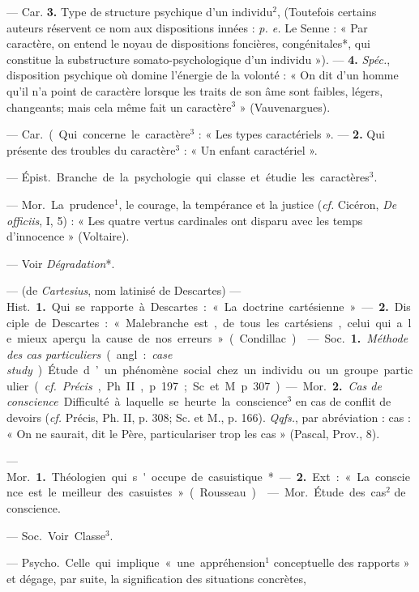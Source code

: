 \begin{itemize}[leftmargin=1cm, label=, itemsep=11pt]
— Car. {\bf 3.} Type de structure psychique d’un individu$^2$, (Toutefois
certains auteurs réservent ce nom
aux dispositions innées : {\it p. e.} Le
Senne : « Par caractère, on entend
le noyau de dispositions foncières,
congénitales*, qui constitue la substructure somato-psychologique d’un
individu »). — {\bf 4.} {\it Spéc.}, disposition
psychique où domine l'énergie de
la volonté : « On dit d’un homme
qu’il n’a point de caractère lorsque
les traits de son âme sont faibles,
légers, changeants; mais cela même
fait un caractère$^3$ » (Vauvenargues).

 — \si{Car.} (. Qui concerne le
caractère$^3$ : « Les types caractériels ». — {\bf 2.} Qui présente des troubles
du caractère$^3$ : « Un enfant caractériel ».

 — \si{Épist.} Branche de la
psychologie qui classe et étudie les
caractères$^3$.

 — \si{Mor.} La prudence$^1$, le courage, la tempérance
et la justice ({\it cf.} Cicéron, {\it De officiis},
I, 5) : « Les quatre vertus cardinales
ont disparu avec les temps d’innocence » (Voltaire).

 — Voir {\it Dégradation}*.

 — (de {\it Cartesius}, nom latinisé
de Descartes) — \si{Hist.} {\bf 1.} Qui se
rapporte à Descartes : « La doctrine
cartésienne ». — {\bf 2.} Disciple de Descartes : « Malebranche est, de tous
les cartésiens, celui qui a le mieux
aperçu la cause de nos erreurs »
(Condillac).

 — \si{Soc.} {\bf 1.} {\it Méthode des cas particuliers} (angl. : {\it case study}). Étude
d’un phénomène social chez un individu ou un groupe particulier ({\it cf.} 
{\it Précis}, Ph. II, p. 197; Sc. et M.
p. 307). — \si{Mor.} {\bf 2.} {\it Cas de conscience}.
Difficulté à laquelle se heurte la
conscience$^3$ en cas de conflit de
devoirs ({\it cf.} Précis, Ph. II, p. 308;
Sc. et M., p. 166). {\it Qqfs.}, par abréviation : cas : « On ne saurait, dit le
Père, particulariser trop les cas »
(Pascal, Prov., 8).

 — \si{Mor.} {\bf 1.} Théologien qui
s'occupe de casuistique*. — {\bf 2.} Ext. :
« La conscience est le meilleur des
casuistes » (Rousseau).

 — \si{Mor.} Étude des cas$^2$
de conscience.

 — \si{Soc.} Voir Classe$^3$.

 — \si{Psycho.}
Celle qui implique « une appréhension$^1$ conceptuelle des rapports » et
dégage, par suite, la signification
des situations concrètes,


\end{itemize}
